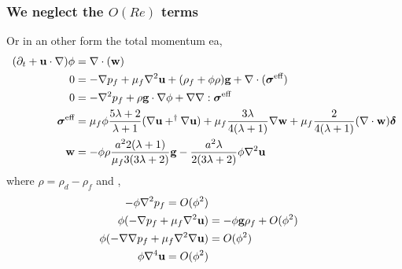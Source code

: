 \subsubsection{We neglect the $O(Re)$ terms}
Or in an other form the total momentum ea,
\begin{align}
    (\partial_t + \textbf{u}\cdot \mathbf{\nabla}) \phi &= \mathbf{\nabla}\cdot(\textbf{w})\\
    0 &= 
    - \mathbf{\nabla} p_f 
    + \mu_f \mathbf{\nabla}^2\textbf{u}
    + (\rho_f +\phi \rho)\textbf{g}
    + \mathbf{\nabla}\cdot (\bm\sigma^\text{eff}) \\
    0 &= 
    - \mathbf{\nabla}^2 p_f  
    + \rho \textbf{g}\cdot \mathbf{\nabla} \phi 
    + \mathbf{\nabla}\mathbf{\nabla} : \bm\sigma^\text{eff}\\
    \bm\sigma^\text{eff}
    &=
     \mu_f \phi \frac{5\lambda +2}{\lambda+1} (\mathbf{\nabla}\textbf{u}+^\dagger \mathbf{\nabla} \textbf{u})
    + \mu_f \frac{3\lambda}{4(\lambda+1)} 
    \mathbf{\nabla}\textbf{w}
    + \mu_f \frac{ 2}{4(\lambda+1)} (\mathbf{\nabla}\cdot\textbf{w} ) \bm\delta\\
    \textbf{w} &= - \phi \rho \frac{a^22(\lambda+1)}{\mu_f 3(3\lambda+2)}\textbf{g} - \frac{a^2\lambda}{2(3\lambda+2)} \phi \mathbf{\nabla}^2 \textbf{u} \\
\end{align} 
where $\rho = \rho_d - \rho_f$ and , 
\begin{align}
    - \phi \mathbf{\nabla}^2 p_f = O(\phi^2)\\
    \phi (-\mathbf{\nabla} p_f+\mu_f \mathbf{\nabla}^2 \textbf{u} )
    &=
    -\phi \textbf{g}\rho_f
    + O(\phi^2)\\
    \phi (-\mathbf{\nabla}\mathbf{\nabla} p_f+\mu_f \mathbf{\nabla}^2 \mathbf{\nabla}\textbf{u} )
    &=
    O(\phi^2)\\
    \phi \mathbf{\nabla}^4 \textbf{u}
    =
    O(\phi^2)
\end{align}  


